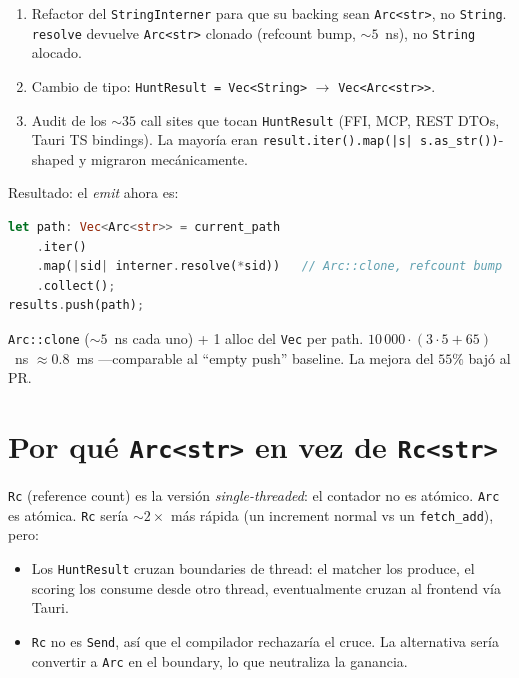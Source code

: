 \begin{enumerate}
    \item Refactor del \texttt{StringInterner} para que su backing
    sean \texttt{Arc<str>}, no \texttt{String}. \texttt{resolve}
    devuelve \texttt{Arc<str>} clonado (refcount bump,
    \(\sim 5\)~ns), no \texttt{String} alocado.
    \item Cambio de tipo: \texttt{HuntResult = Vec<String>}
    $\rightarrow$ \texttt{Vec<Arc<str>>}.
    \item Audit de los $\sim 35$ call sites que tocan
    \texttt{HuntResult} (FFI, MCP, REST DTOs, Tauri TS bindings).
    La mayoría eran \texttt{result.iter().map(|s|
    s.as\_str())}-shaped y migraron mecánicamente.
\end{enumerate}

\noindent
Resultado: el \emph{emit} ahora es:

\begin{lstlisting}[language=Rust]
let path: Vec<Arc<str>> = current_path
    .iter()
    .map(|sid| interner.resolve(*sid))   // Arc::clone, refcount bump
    .collect();
results.push(path);
\end{lstlisting}

 \texttt{Arc::clone} (\(\sim 5\)~ns cada uno) + 1 alloc del
\texttt{Vec} per path. \(10\,000 \cdot (3 \cdot 5 + 65)\)~ns
\(\approx 0.8\)~ms ---comparable al ``empty push'' baseline. La
mejora del \(55\%\) bajó al PR.

\section{Por qué \texttt{Arc<str>} en vez de \texttt{Rc<str>}}

\texttt{Rc} (reference count) es la versión \emph{single-threaded}:
el contador no es atómico. \texttt{Arc} es atómica. \texttt{Rc}
sería \(\sim 2\times\) más rápida (un increment normal vs un
\texttt{fetch\_add}), pero:

\begin{itemize}
    \item Los \texttt{HuntResult} cruzan boundaries de thread: el
    matcher los produce, el scoring los consume desde otro thread,
    eventualmente cruzan al frontend vía Tauri.
    \item \texttt{Rc} no es \texttt{Send}, así que el compilador
    rechazaría el cruce. La alternativa sería convertir a
    \texttt{Arc} en el boundary, lo que neutraliza la ganancia.
\end{itemize}

